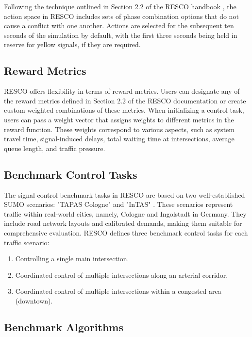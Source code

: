 Following the technique outlined in Section 2.2 of the RESCO handbook \cite{codeca2018monaco}, the action space in RESCO includes sets of phase combination options that do not cause a conflict with one another. Actions are selected for the subsequent ten seconds of the simulation by default, with the first three seconds being held in reserve for yellow signals, if they are required.

\subsection{Reward Metrics}

RESCO offers flexibility in terms of reward metrics. Users can designate any of the reward metrics defined in Section 2.2 of the RESCO documentation\cite{codeca2018monaco} or create custom weighted combinations of these metrics. When initializing a control task, users can pass a weight vector that assigns weights to different metrics in the reward function. These weights correspond to various aspects, such as system travel time, signal-induced delays, total waiting time at intersections, average queue length, and traffic pressure.

\subsection{Benchmark Control Tasks}

The signal control benchmark tasks in RESCO are based on two well-established SUMO scenarios: "TAPAS Cologne" and "InTAS" \cite{pham2013learning, lobo2020intas}. These scenarios represent traffic within real-world cities, namely, Cologne and Ingolstadt in Germany. They include road network layouts and calibrated demands, making them suitable for comprehensive evaluation. RESCO defines three benchmark control tasks for each traffic scenario:

\begin{enumerate}
    \item Controlling a single main intersection.
    \item Coordinated control of multiple intersections along an arterial corridor.
    \item Coordinated control of multiple intersections within a congested area (downtown).
\end{enumerate}

\subsection{Benchmark Algorithms}

